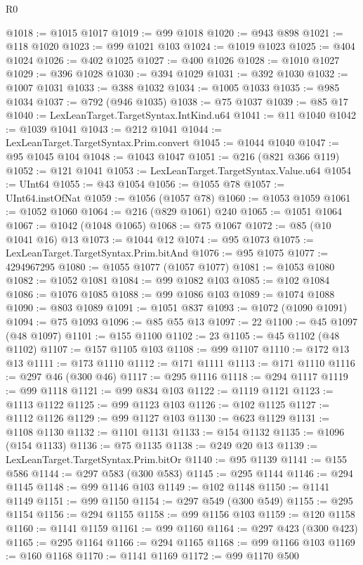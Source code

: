\begin{lexlean}{R0}
\begin{coremodule}
@1018 := @1015 @1017
@1019 := @99 @1018
@1020 := @943 @898
@1021 := @118 @1020
@1023 := @99 @1021 @103
@1024 := @1019 @1023
@1025 := @404 @1024
@1026 := @402 @1025
@1027 := @400 @1026
@1028 := @1010 @1027
@1029 := @396 @1028
@1030 := @394 @1029
@1031 := @392 @1030
@1032 := @1007 @1031
@1033 := @388 @1032
@1034 := @1005 @1033
@1035 := @985 @1034
@1037 := @792 (@946 @1035)
@1038 := @75 @1037
@1039 := @85 @17
@1040 := LexLeanTarget.TargetSyntax.IntKind.u64
@1041 := @11 @1040
@1042 := @1039 @1041
@1043 := @212 @1041
@1044 := LexLeanTarget.TargetSyntax.Prim.convert
@1045 := @1044 @1040
@1047 := @95 @1045 @104
@1048 := @1043 @1047
@1051 := @216 (@821 @366 @119)
@1052 := @121 @1041
@1053 := LexLeanTarget.TargetSyntax.Value.u64
@1054 := UInt64
@1055 := @43 @1054
@1056 := @1055 @78
@1057 := UInt64.instOfNat
@1059 := @1056 (@1057 @78)
@1060 := @1053 @1059
@1061 := @1052 @1060
@1064 := @216 (@829 @1061) @240
@1065 := @1051 @1064
@1067 := @1042 (@1048 @1065)
@1068 := @75 @1067
@1072 := @85 (@10 @1041 @16) @13
@1073 := @1044 @12
@1074 := @95 @1073
@1075 := LexLeanTarget.TargetSyntax.Prim.bitAnd
@1076 := @95 @1075
@1077 := 4294967295
@1080 := @1055 @1077 (@1057 @1077)
@1081 := @1053 @1080
@1082 := @1052 @1081
@1084 := @99 @1082 @103
@1085 := @102 @1084
@1086 := @1076 @1085
@1088 := @99 @1086 @103
@1089 := @1074 @1088
@1090 := @803 @1089
@1091 := @1051 @837
@1093 := @1072 (@1090 @1091)
@1094 := @75 @1093
@1096 := @85 @55 @13
@1097 := 22
@1100 := @45 @1097 (@48 @1097)
@1101 := @155 @1100
@1102 := 23
@1105 := @45 @1102 (@48 @1102)
@1107 := @157 @1105 @103
@1108 := @99 @1107
@1110 := @172 @13 @13
@1111 := @173 @1110
@1112 := @171 @1111
@1113 := @171 @1110
@1116 := @297 @46 (@300 @46)
@1117 := @295 @1116
@1118 := @294 @1117
@1119 := @99 @1118
@1121 := @99 @834 @103
@1122 := @1119 @1121
@1123 := @1113 @1122
@1125 := @99 @1123 @103
@1126 := @102 @1125
@1127 := @1112 @1126
@1129 := @99 @1127 @103
@1130 := @623 @1129
@1131 := @1108 @1130
@1132 := @1101 @1131
@1133 := @154 @1132
@1135 := @1096 (@154 @1133)
@1136 := @75 @1135
@1138 := @249 @20 @13
@1139 := LexLeanTarget.TargetSyntax.Prim.bitOr
@1140 := @95 @1139
@1141 := @155 @586
@1144 := @297 @583 (@300 @583)
@1145 := @295 @1144
@1146 := @294 @1145
@1148 := @99 @1146 @103
@1149 := @102 @1148
@1150 := @1141 @1149
@1151 := @99 @1150
@1154 := @297 @549 (@300 @549)
@1155 := @295 @1154
@1156 := @294 @1155
@1158 := @99 @1156 @103
@1159 := @120 @1158
@1160 := @1141 @1159
@1161 := @99 @1160
@1164 := @297 @423 (@300 @423)
@1165 := @295 @1164
@1166 := @294 @1165
@1168 := @99 @1166 @103
@1169 := @160 @1168
@1170 := @1141 @1169
@1172 := @99 @1170 @500

\end{coremodule}
\end{lexlean}
